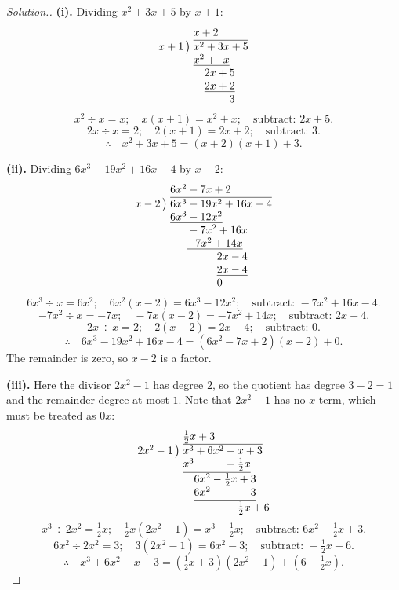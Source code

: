 \documentclass[11pt,a4paper]{article}
\theoremstyle{definition}
\newenvironment{solution}
  {\renewcommand{\qedsymbol}{}\begin{proof}[\textit{Solution}.]}
  {\end{proof}}
\begin{document}
\begin{solution}
\textbf{(i).} Dividing $x^2+3x+5$ by $x+1$:
$$\begin{array}{r@{\;}l}
 & x+2\\
x+1\,\big) & \overline{x^{2}+3x+5}\\
 & \underline{x^{2}+\phantom{2}x}\phantom{{}+5}\\
 & \phantom{x^{2}}2x+5\\
 & \phantom{x^{2}}\underline{2x+2}\\
 & \phantom{x^{2}+2x}3
\end{array}$$
$$x^2\div x=x;\quad x(x+1)=x^2+x;\quad \text{subtract: } 2x+5.$$
$$2x\div x=2;\quad 2(x+1)=2x+2;\quad \text{subtract: } 3.$$
$$\therefore\quad x^2+3x+5=(x+2)(x+1)+3.$$

\textbf{(ii).} Dividing $6x^3-19x^2+16x-4$ by $x-2$:
$$\begin{array}{r@{\;}l}
 & 6x^{2}-7x+2\\
x-2\,\big) & \overline{6x^{3}-19x^{2}+16x-4}\\
 & \underline{6x^{3}-12x^{2}}\phantom{{}+16x-4}\\
 & \phantom{6x^{3}}-7x^{2}+16x\phantom{{}-4}\\
 & \phantom{6x^{3}}\underline{-7x^{2}+14x}\phantom{{}-4}\\
 & \phantom{6x^{3}-7x^{2}}2x-4\\
 & \phantom{6x^{3}-7x^{2}}\underline{2x-4}\\
 & \phantom{6x^{3}-7x^{2}}0
\end{array}$$
$$6x^3\div x=6x^2;\quad 6x^2(x-2)=6x^3-12x^2;\quad \text{subtract: } -7x^2+16x-4.$$
$$-7x^2\div x=-7x;\quad -7x(x-2)=-7x^2+14x;\quad \text{subtract: } 2x-4.$$
$$2x\div x=2;\quad 2(x-2)=2x-4;\quad \text{subtract: } 0.$$
$$\therefore\quad 6x^3-19x^2+16x-4=\left(6x^2-7x+2\right)(x-2)+0.$$
The remainder is zero, so $x-2$ is a factor.

\textbf{(iii).} Here the divisor $2x^2-1$ has degree $2$, so the quotient has degree
$3-2=1$ and the remainder degree at most $1$. Note that $2x^2-1$ has no $x$ term, which
must be treated as $0x$:
$$\begin{array}{r@{\;}l}
 & \tfrac{1}{2}x+3\\
2x^{2}-1\,\big) & \overline{x^{3}+6x^{2}-x+3}\\
 & \underline{x^{3}\phantom{{}+6x^{2}}-\tfrac{1}{2}x}\phantom{{}+3}\\
 & \phantom{x^{3}}6x^{2}-\tfrac{1}{2}x+3\\
 & \phantom{x^{3}}\underline{6x^{2}\phantom{{}-\tfrac{1}{2}x}-3}\\
 & \phantom{x^{3}+6x^{2}}-\tfrac{1}{2}x+6
\end{array}$$
$$x^3\div 2x^2=\tfrac{1}{2}x;\quad \tfrac{1}{2}x\left(2x^2-1\right)=x^3-\tfrac{1}{2}x;
\quad \text{subtract: } 6x^2-\tfrac{1}{2}x+3.$$
$$6x^2\div 2x^2=3;\quad 3\left(2x^2-1\right)=6x^2-3;\quad
\text{subtract: } -\tfrac{1}{2}x+6.$$
$$\therefore\quad x^3+6x^2-x+3=\left(\tfrac{1}{2}x+3\right)\left(2x^2-1\right)
+\left(6-\tfrac{1}{2}x\right).$$


\end{solution}
\end{document}
